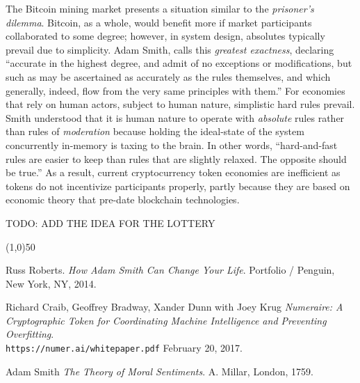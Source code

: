 \documentclass{article}
\begin{document}
The Bitcoin mining market presents a situation similar to the \textit{prisoner's dilemma}. Bitcoin, as a whole, would benefit more if market participants collaborated to some degree; however, in system design, absolutes typically prevail due to simplicity. Adam Smith, calls this \textit{greatest exactness}, declaring ``accurate in the highest degree, and admit of no exceptions or modifications, but such as may be ascertained as accurately as the rules themselves, and which generally, indeed, flow from the very same principles with them.''\cite{adamsmith-sentiments} For economies that rely on human actors, subject to human nature, simplistic hard rules prevail. Smith understood that it is human nature to operate with \textit{absolute} rules rather than rules of \textit{moderation} because holding the ideal-state of the system concurrently in-memory is taxing to the brain. In other words, ``hard-and-fast rules are easier to keep than rules that are slightly relaxed. The opposite should be true.''\cite{roberts-howadamsmith} As a result, current cryptocurrency token economies are inefficient as tokens do not incentivize participants properly, partly because they are based on economic theory that pre-date blockchain technologies.

TODO: ADD THE IDEA FOR THE LOTTERY

\begin{center}
\line(1,0){50}
\end{center}

\begin{thebibliography}{9}
Russ Roberts.
\textit{How Adam Smith Can Change Your Life}.
Portfolio / Penguin, New York, NY, 2014.

Richard Craib, Geoffrey Bradway, Xander Dunn with Joey Krug
\textit{Numeraire: A Cryptographic Token for Coordinating Machine Intelligence and Preventing Overfitting}.
\\\texttt{https://numer.ai/whitepaper.pdf}
February 20, 2017.

Adam Smith
\textit{The Theory of Moral Sentiments}.
A. Millar, London, 1759.


\end{thebibliography}

\end{document}
